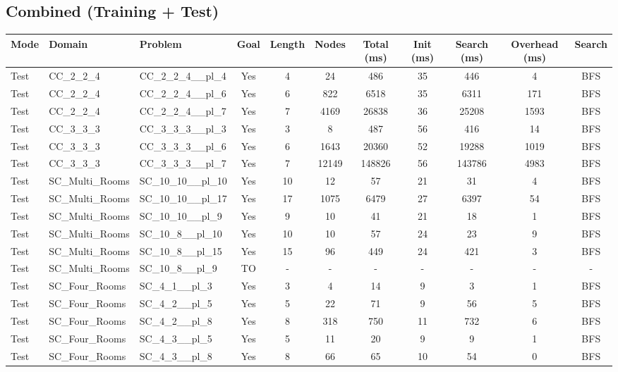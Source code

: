 \documentclass{article}
\begin{document}
\subsection*{Combined (Training + Test)}
\begin{tabular}{lllcccccccc}
\toprule
Mode & Domain & Problem & Goal & Length & Nodes & Total (ms) & Init (ms) & Search (ms) & Overhead (ms) & Search \\
\midrule
Test & CC\_2\_2\_4 & CC\_2\_2\_4\_\_pl\_4 & Yes & 4 & 24 & 486 & 35 & 446 & 4 & BFS \\
Test & CC\_2\_2\_4 & CC\_2\_2\_4\_\_pl\_6 & Yes & 6 & 822 & 6518 & 35 & 6311 & 171 & BFS \\
Test & CC\_2\_2\_4 & CC\_2\_2\_4\_\_pl\_7 & Yes & 7 & 4169 & 26838 & 36 & 25208 & 1593 & BFS \\
Test & CC\_3\_3\_3 & CC\_3\_3\_3\_\_pl\_3 & Yes & 3 & 8 & 487 & 56 & 416 & 14 & BFS \\
Test & CC\_3\_3\_3 & CC\_3\_3\_3\_\_pl\_6 & Yes & 6 & 1643 & 20360 & 52 & 19288 & 1019 & BFS \\
Test & CC\_3\_3\_3 & CC\_3\_3\_3\_\_pl\_7 & Yes & 7 & 12149 & 148826 & 56 & 143786 & 4983 & BFS \\
Test & SC\_Multi\_Rooms & SC\_10\_10\_\_pl\_10 & Yes & 10 & 12 & 57 & 21 & 31 & 4 & BFS \\
Test & SC\_Multi\_Rooms & SC\_10\_10\_\_pl\_17 & Yes & 17 & 1075 & 6479 & 27 & 6397 & 54 & BFS \\
Test & SC\_Multi\_Rooms & SC\_10\_10\_\_pl\_9 & Yes & 9 & 10 & 41 & 21 & 18 & 1 & BFS \\
Test & SC\_Multi\_Rooms & SC\_10\_8\_\_pl\_10 & Yes & 10 & 10 & 57 & 24 & 23 & 9 & BFS \\
Test & SC\_Multi\_Rooms & SC\_10\_8\_\_pl\_15 & Yes & 15 & 96 & 449 & 24 & 421 & 3 & BFS \\
Test & SC\_Multi\_Rooms & SC\_10\_8\_\_pl\_9 & TO & - & - & - & - & - & - & - \\
Test & SC\_Four\_Rooms & SC\_4\_1\_\_pl\_3 & Yes & 3 & 4 & 14 & 9 & 3 & 1 & BFS \\
Test & SC\_Four\_Rooms & SC\_4\_2\_\_pl\_5 & Yes & 5 & 22 & 71 & 9 & 56 & 5 & BFS \\
Test & SC\_Four\_Rooms & SC\_4\_2\_\_pl\_8 & Yes & 8 & 318 & 750 & 11 & 732 & 6 & BFS \\
Test & SC\_Four\_Rooms & SC\_4\_3\_\_pl\_5 & Yes & 5 & 11 & 20 & 9 & 9 & 1 & BFS \\
Test & SC\_Four\_Rooms & SC\_4\_3\_\_pl\_8 & Yes & 8 & 66 & 65 & 10 & 54 & 0 & BFS \\

\end{tabular}
\end{document}
